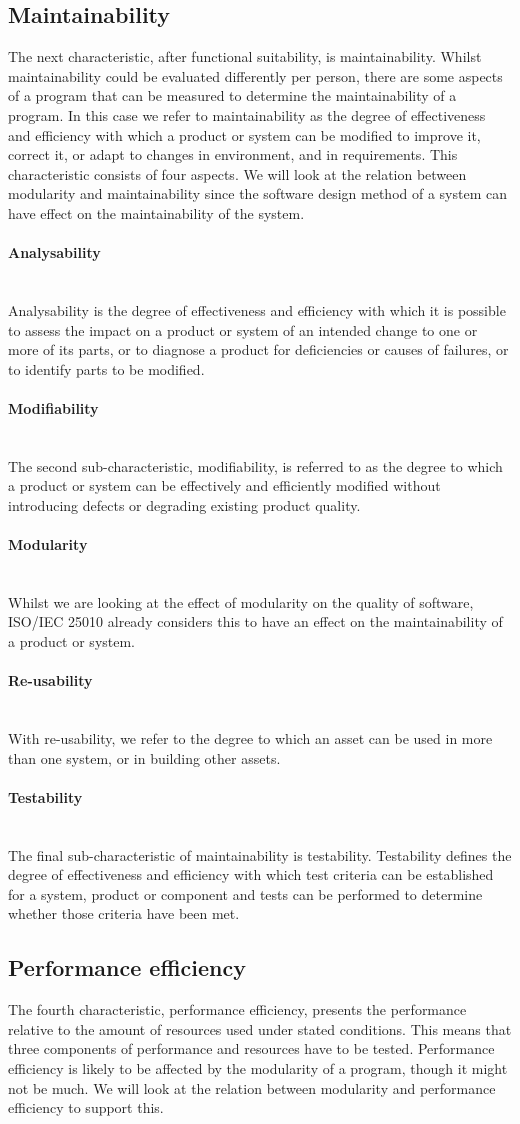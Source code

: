\documentclass[twoside]{uva-inf-bachelor-thesis}
\newcommand{\myparagraph}[1]{\paragraph{#1}\mbox{}\\}
\begin{document}
\subsection{Maintainability}
The next characteristic, after functional suitability, is maintainability. Whilst maintainability could be evaluated differently per person, there are some aspects of a program that can be measured to determine the maintainability of a program. In this case we refer to maintainability as the degree of effectiveness and efficiency with which a product or system can be modified to improve it, correct it, or adapt to changes in environment, and in requirements. This characteristic consists of four aspects. We will look at the relation between modularity and maintainability since the software design method of a system can have effect on the maintainability of the system.

\myparagraph{Analysability}
Analysability is the degree of effectiveness and efficiency with which it is possible to assess the impact on a product or system of an intended change to one or more of its parts, or to diagnose a product for deficiencies or causes of failures, or to identify parts to be modified.

\myparagraph{Modifiability}
The second sub-characteristic, modifiability, is referred to as the degree to which a product or system can be effectively and efficiently modified without introducing defects or degrading existing product quality.

\myparagraph{Modularity}
Whilst we are looking at the effect of modularity on the quality of software, ISO/IEC 25010 already considers this to have an effect on the maintainability of a product or system.

\myparagraph{Re-usability}
With re-usability, we refer to the degree to which an asset can be used in more than one system, or in building other assets.

\myparagraph{Testability}
The final sub-characteristic of maintainability is testability. Testability defines the degree of effectiveness and efficiency with which test criteria can be established for a system, product or component and tests can be performed to determine whether those criteria have been met.

\subsection{Performance efficiency}
The fourth characteristic, performance efficiency, presents the performance relative to the amount of resources used under stated conditions. This means that three components of performance and resources have to be tested. Performance efficiency is likely to be affected by the modularity of a program, though it might not be much. We will look at the relation between modularity and performance efficiency to support this.
\end{document}
